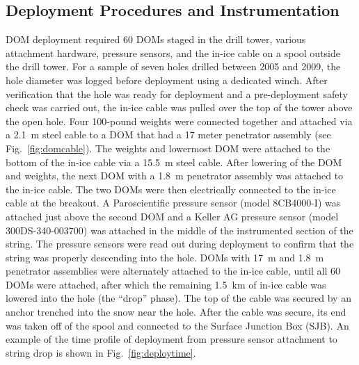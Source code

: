 
\subsection{\label{sec:deployment_inst}Deployment Procedures and Instrumentation}

DOM deployment required 60 DOMs staged in the drill tower, various
attachment hardware, pressure sensors, and the in-ice cable on a spool
outside the drill tower. For a sample of seven holes drilled between
2005 and 2009, the hole diameter was logged before deployment using a
dedicated winch. After verification that the hole was 
ready for deployment and a pre-deployment safety check was carried out, the in-ice cable
was pulled over the top of the tower above the open hole. Four 100-pound
weights were connected together and attached via a 2.1~m steel cable to a
DOM that had a 17 meter penetrator assembly (see Fig.~\ref{fig:domcable}). The weights and
lowermost DOM were attached to the bottom of the in-ice cable via a 15.5~m
steel cable. After lowering of the DOM and weights, the next DOM with a
1.8~m penetrator assembly was attached to the in-ice cable. The two DOMs were
then electrically connected to the in-ice cable at the breakout. A
Paroscientific pressure sensor (model 8CB4000-I) was attached just above the second DOM
and a Keller AG pressure sensor (model 300DS-340-003700) was attached in the middle of the
instrumented section of the string. The
pressure sensors were read out during deployment to confirm that the string
was properly descending into the hole.   DOMs with 17~m and
1.8~m penetrator assemblies were alternately attached to the in-ice 
cable, until all 60 DOMs were attached, after which the remaining 1.5~km of
in-ice cable was lowered into the hole (the ``drop'' phase). The top of the
cable was secured by an anchor trenched into the snow near the hole. After the
cable was secure, its end was taken off of the spool and connected to the
Surface Junction Box (SJB). An example of the time profile of deployment from pressure sensor
attachment to string drop is shown in Fig.~\ref{fig:deploytime}.

